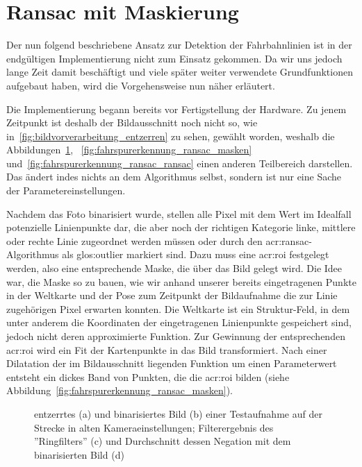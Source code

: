 \section{Ransac mit Maskierung} \label{sec:maskenbau}

Der nun folgend beschriebene Ansatz zur Detektion der Fahrbahnlinien ist in der endgültigen Implementierung nicht zum Einsatz gekommen. Da wir uns jedoch lange Zeit damit beschäftigt und viele später weiter verwendete Grundfunktionen aufgebaut haben, wird die Vorgehensweise nun näher erläutert.

Die Implementierung begann bereits vor Fertigstellung der Hardware. Zu jenem Zeitpunkt ist deshalb der Bildausschnitt noch nicht so, wie in~\ref{fig:bildvorverarbeitung_entzerren} zu sehen, gewählt worden, weshalb die Abbildungen~\ref{fig:fahrspurerkennung_ransac_binarisieren}, ~\ref{fig:fahrspurerkennung_ransac_masken} und~\ref{fig:fahrspurerkennung_ransac_ransac} einen anderen Teilbereich darstellen. Das ändert indes nichts an dem Algorithmus selbst, sondern ist nur eine Sache der Parametereinstellungen. 

Nachdem das Foto binarisiert wurde, stellen alle Pixel mit dem Wert \grqq{} im Idealfall potenzielle Linienpunkte dar, die aber noch der richtigen Kategorie \glqq linke\grqq , \glqq mittlere\grqq{} oder \glqq rechte\grqq{} Linie zugeordnet werden müssen oder durch den \gls{acr:ransac}-Algorithmus als \gls{glos:outlier} markiert sind. Dazu muss eine \gls{acr:roi} festgelegt werden, also eine entsprechende Maske, die über das Bild gelegt wird. Die Idee war, die Maske so zu bauen, wie wir anhand unserer bereits eingetragenen Punkte in der Weltkarte und der Pose zum Zeitpunkt der Bildaufnahme die zur Linie zugehörigen Pixel erwarten konnten. Die Weltkarte ist ein Struktur-Feld, in dem unter anderem die Koordinaten der eingetragenen Linienpunkte gespeichert sind, jedoch nicht deren approximierte Funktion. Zur Gewinnung der entsprechenden \gls{acr:roi} wird ein Fit der Kartenpunkte in das Bild transformiert. Nach einer Dilatation der im Bildausschnitt liegenden Funktion um einen Parameterwert entsteht ein dickes Band von Punkten, die die \gls{acr:roi} bilden (siehe Abbildung~\ref{fig:fahrspurerkennung_ransac_masken}).

\begin{figure}[H]
  \centering
  \qquad \quad
  \qquad \quad
  \qquad \quad
  \caption{entzerrtes (a) und binarisiertes Bild (b) einer Testaufnahme auf der Strecke in alten Kameraeinstellungen; Filterergebnis des ''Ringfilters'' (c) und Durchschnitt dessen Negation mit dem binarisierten Bild (d)}
\label{fig:fahrspurerkennung_ransac_binarisieren}
\end{figure} 

